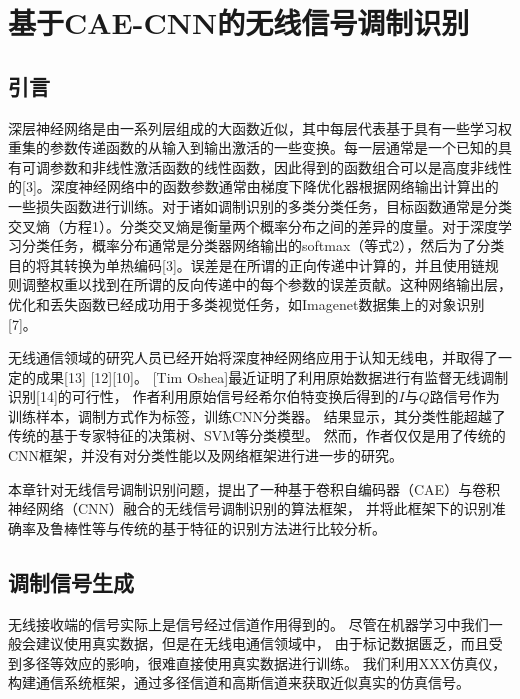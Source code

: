 \chapter{基于CAE-CNN的无线信号调制识别}

\section{引言}

深层神经网络是由一系列层组成的大函数近似，其中每层代表基于具有一些学习权重集的参数传递函数的从输入到输出激活的一些变换。每一层通常是一个已知的具有可调参数和非线性激活函数的线性函数，因此得到的函数组合可以是高度非线性的[3]。深度神经网络中的函数参数通常由梯度下降优化器根据网络输出计算出的一些损失函数进行训练。对于诸如调制识别的多类分类任务，目标函数通常是分类交叉熵（方程1）。分类交叉熵是衡量两个概率分布之间的差异的度量。对于深度学习分类任务，概率分布通常是分类器网络输出的softmax（等式2），然后为了分类目的将其转换为单热编码[3]。误差是在所谓的正向传递中计算的，并且使用链规则调整权重以找到在所谓的反向传递中的每个参数的误差贡献。这种网络输出层，优化和丢失函数已经成功用于多类视觉任务，如Imagenet数据集上的对象识别[7]。\par

无线通信领域的研究人员已经开始将深度神经网络应用于认知无线电，并取得了一定的成果[13] [12][10]。
[Tim Oshea]最近证明了利用原始数据进行有监督无线调制识别[14]的可行性，
作者利用原始信号经希尔伯特变换后得到的$I$与$Q$路信号作为训练样本，调制方式作为标签，训练CNN分类器。
结果显示，其分类性能超越了传统的基于专家特征的决策树、SVM等分类模型。
然而，作者仅仅是用了传统的CNN框架，并没有对分类性能以及网络框架进行进一步的研究。\par

本章针对无线信号调制识别问题，提出了一种基于卷积自编码器（CAE）与卷积神经网络（CNN）融合的无线信号调制识别的算法框架，
并将此框架下的识别准确率及鲁棒性等与传统的基于特征的识别方法进行比较分析。\par


\section{调制信号生成}

无线接收端的信号实际上是信号经过信道作用得到的。
尽管在机器学习中我们一般会建议使用真实数据，但是在无线电通信领域中，
由于标记数据匮乏，而且受到多径等效应的影响，很难直接使用真实数据进行训练。
我们利用XXX仿真仪，构建通信系统框架，通过多径信道和高斯信道来获取近似真实的仿真信号。\par


